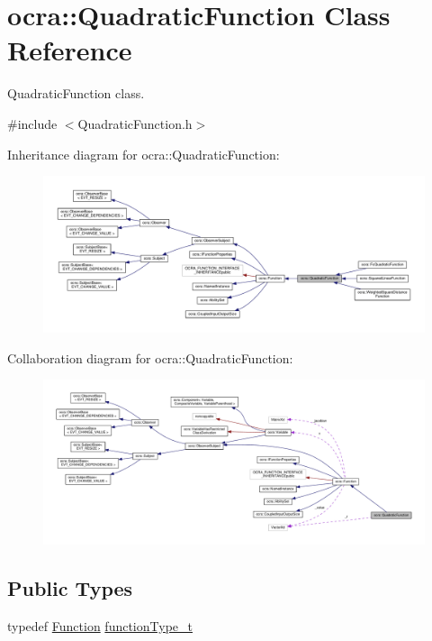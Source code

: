 \hypertarget{classocra_1_1QuadraticFunction}{}\section{ocra\+:\+:Quadratic\+Function Class Reference}
\label{classocra_1_1QuadraticFunction}


Quadratic\+Function class.  




{\ttfamily \#include $<$Quadratic\+Function.\+h$>$}



Inheritance diagram for ocra\+:\+:Quadratic\+Function\+:
\nopagebreak
\begin{figure}[H]
\begin{center}
\leavevmode
\includegraphics[width=350pt]{d7/d45/classocra_1_1QuadraticFunction__inherit__graph}
\end{center}
\end{figure}


Collaboration diagram for ocra\+:\+:Quadratic\+Function\+:
\nopagebreak
\begin{figure}[H]
\begin{center}
\leavevmode
\includegraphics[width=350pt]{d2/deb/classocra_1_1QuadraticFunction__coll__graph}
\end{center}
\end{figure}
\subsection*{Public Types}
\begin{DoxyCompactItemize}
\item 
typedef \hyperlink{classocra_1_1Function}{Function} \hyperlink{classocra_1_1QuadraticFunction_a224eecd300c5a16599ebd6e4eff5d9d7}{function\+Type\+\_\+t}
\end{DoxyCompactItemize}
